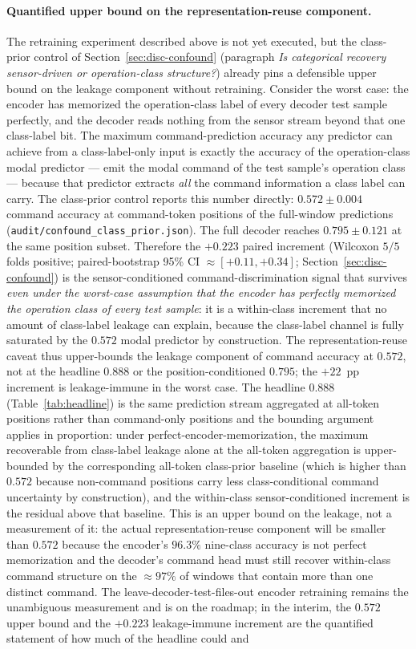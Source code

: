 \documentclass[sensors,article,submit,moreauthors,pdftex]{Definitions/mdpi}
\begin{document}
\paragraph{Quantified upper bound on the representation-reuse component.} The retraining experiment described above is not yet executed, but the class-prior control of Section~\ref{sec:disc-confound} (paragraph \emph{Is categorical recovery sensor-driven or operation-class structure?}) already pins a defensible upper bound on the leakage component without retraining. Consider the worst case: the encoder has memorized the operation-class label of every decoder test sample perfectly, and the decoder reads nothing from the sensor stream beyond that one class-label bit. The maximum command-prediction accuracy any predictor can achieve from a class-label-only input is exactly the accuracy of the operation-class modal predictor --- emit the modal command of the test sample's operation class --- because that predictor extracts \emph{all} the command information a class label can carry. The class-prior control reports this number directly: $0.572 \pm 0.004$ command accuracy at command-token positions of the full-window predictions (\texttt{audit/confound\_class\_prior.json}). The full decoder reaches $0.795 \pm 0.121$ at the same position subset. Therefore the $+0.223$ paired increment (Wilcoxon $5/5$ folds positive; paired-bootstrap 95\% CI $\approx [+0.11, +0.34]$; Section~\ref{sec:disc-confound}) is the sensor-conditioned command-discrimination signal that survives \emph{even under the worst-case assumption that the encoder has perfectly memorized the operation class of every test sample}: it is a within-class increment that no amount of class-label leakage can explain, because the class-label channel is fully saturated by the $0.572$ modal predictor by construction. The representation-reuse caveat thus upper-bounds the leakage component of command accuracy at $0.572$, not at the headline $0.888$ or the position-conditioned $0.795$; the $+22$~pp increment is leakage-immune in the worst case. The headline $0.888$ (Table~\ref{tab:headline}) is the same prediction stream aggregated at all-token positions rather than command-only positions and the bounding argument applies in proportion: under perfect-encoder-memorization, the maximum recoverable from class-label leakage alone at the all-token aggregation is upper-bounded by the corresponding all-token class-prior baseline (which is higher than $0.572$ because non-command positions carry less class-conditional command uncertainty by construction), and the within-class sensor-conditioned increment is the residual above that baseline. This is an upper bound on the leakage, not a measurement of it: the actual representation-reuse component will be smaller than $0.572$ because the encoder's $96.3\%$ nine-class accuracy is not perfect memorization and the decoder's command head must still recover within-class command structure on the $\approx\!97\%$ of windows that contain more than one distinct command. The leave-decoder-test-files-out encoder retraining remains the unambiguous measurement and is on the roadmap; in the interim, the $0.572$ upper bound and the $+0.223$ leakage-immune increment are the quantified statement of how much of the headline could and 
\end{document}
